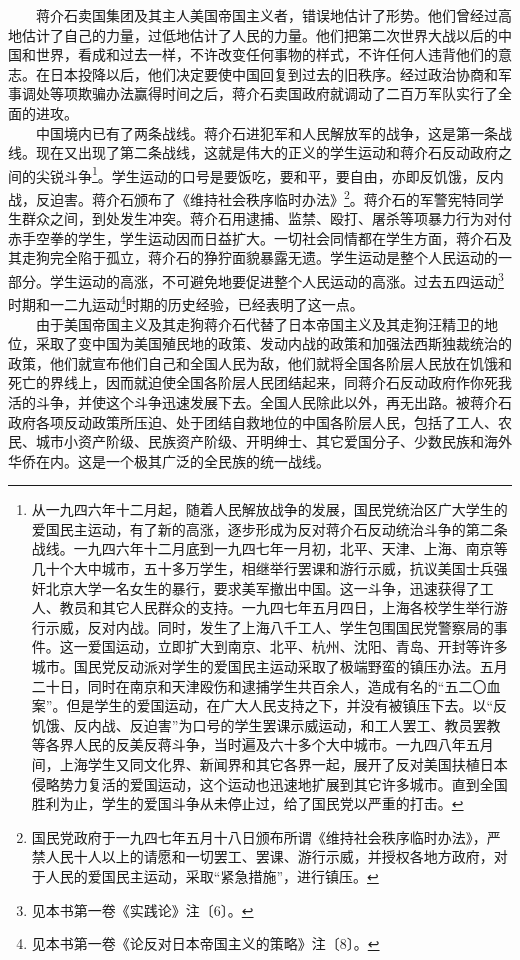 \documentclass[cn,11pt,chinese]{elegantbook}
\begin{document}
　　蒋介石卖国集团及其主人美国帝国主义者，错误地估计了形势。他们曾经过高地估计了自己的力量，过低地估计了人民的力量。他们把第二次世界大战以后的中国和世界，看成和过去一样，不许改变任何事物的样式，不许任何人违背他们的意志。在日本投降以后，他们决定要使中国回复到过去的旧秩序。经过政治协商和军事调处等项欺骗办法赢得时间之后，蒋介石卖国政府就调动了二百万军队实行了全面的进攻。\\
　　中国境内已有了两条战线。蒋介石进犯军和人民解放军的战争，这是第一条战线。现在又出现了第二条战线，这就是伟大的正义的学生运动和蒋介石反动政府之间的尖锐斗争\footnote[1]{ 从一九四六年十二月起，随着人民解放战争的发展，国民党统治区广大学生的爱国民主运动，有了新的高涨，逐步形成为反对蒋介石反动统治斗争的第二条战线。一九四六年十二月底到一九四七年一月初，北平、天津、上海、南京等几十个大中城市，五十多万学生，相继举行罢课和游行示威，抗议美国士兵强奸北京大学一名女生的暴行，要求美军撤出中国。这一斗争，迅速获得了工人、教员和其它人民群众的支持。一九四七年五月四日，上海各校学生举行游行示威，反对内战。同时，发生了上海八千工人、学生包围国民党警察局的事件。这一爱国运动，立即扩大到南京、北平、杭州、沈阳、青岛、开封等许多城市。国民党反动派对学生的爱国民主运动采取了极端野蛮的镇压办法。五月二十日，同时在南京和天津殴伤和逮捕学生共百余人，造成有名的“五二〇血案”。但是学生的爱国运动，在广大人民支持之下，并没有被镇压下去。以“反饥饿、反内战、反迫害”为口号的学生罢课示威运动，和工人罢工、教员罢教等各界人民的反美反蒋斗争，当时遍及六十多个大中城市。一九四八年五月间，上海学生又同文化界、新闻界和其它各界一起，展开了反对美国扶植日本侵略势力复活的爱国运动，这个运动也迅速地扩展到其它许多城市。直到全国胜利为止，学生的爱国斗争从未停止过，给了国民党以严重的打击。}。学生运动的口号是要饭吃，要和平，要自由，亦即反饥饿，反内战，反迫害。蒋介石颁布了《维持社会秩序临时办法》\footnote[2]{ 国民党政府于一九四七年五月十八日颁布所谓《维持社会秩序临时办法》，严禁人民十人以上的请愿和一切罢工、罢课、游行示威，并授权各地方政府，对于人民的爱国民主运动，采取“紧急措施”，进行镇压。}。蒋介石的军警宪特同学生群众之间，到处发生冲突。蒋介石用逮捕、监禁、殴打、屠杀等项暴力行为对付赤手空拳的学生，学生运动因而日益扩大。一切社会同情都在学生方面，蒋介石及其走狗完全陷于孤立，蒋介石的狰狞面貌暴露无遗。学生运动是整个人民运动的一部分。学生运动的高涨，不可避免地要促进整个人民运动的高涨。过去五四运动\footnote[3]{ 见本书第一卷《实践论》注〔6〕。}时期和一二九运动\footnote[4]{ 见本书第一卷《论反对日本帝国主义的策略》注〔8〕。}时期的历史经验，已经表明了这一点。\\
　　由于美国帝国主义及其走狗蒋介石代替了日本帝国主义及其走狗汪精卫的地位，采取了变中国为美国殖民地的政策、发动内战的政策和加强法西斯独裁统治的政策，他们就宣布他们自己和全国人民为敌，他们就将全国各阶层人民放在饥饿和死亡的界线上，因而就迫使全国各阶层人民团结起来，同蒋介石反动政府作你死我活的斗争，并使这个斗争迅速发展下去。全国人民除此以外，再无出路。被蒋介石政府各项反动政策所压迫、处于团结自救地位的中国各阶层人民，包括了工人、农民、城市小资产阶级、民族资产阶级、开明绅士、其它爱国分子、少数民族和海外华侨在内。这是一个极其广泛的全民族的统一战线。\\
\end{document}
